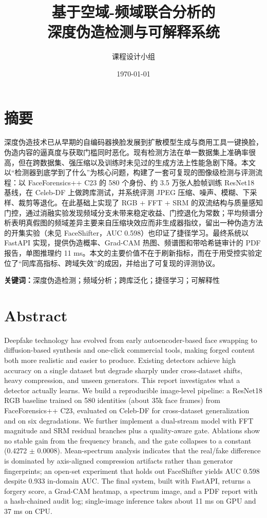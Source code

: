 \documentclass[12pt,a4paper]{article}
\title{\textbf{基于空域-频域联合分析的\\深度伪造检测与可解释系统}}
\author{课程设计小组}
\date{\today}
\begin{document}


\section*{摘要}

\noindent
深度伪造技术已从早期的自编码器换脸发展到扩散模型生成与商用工具一键换脸，伪造内容的逼真度与获取门槛同时恶化。现有检测方法在单一数据集上准确率很高，但在跨数据集、强压缩以及训练时未见过的生成方法上性能急剧下降。本文以“检测器到底学到了什么”为核心问题，构建了一套可复现的图像级检测与评测流程：以 FaceForensics++ C23 的 580 个身份、约 3.5 万张人脸帧训练 ResNet18 基线，在 Celeb-DF 上做跨库测试，并系统评测 JPEG 压缩、噪声、模糊、下采样、裁剪等退化。在此基础上实现了 RGB + FFT + SRM 的双流结构与质量感知门控，通过消融实验发现频域分支未带来稳定收益、门控退化为常数；平均频谱分析表明真假图的频域差异主要来自压缩块效应而非生成器指纹，留出一种伪造方法的开集实验（未见 FaceShifter，AUC 0.598）也印证了捷径学习。最终系统以 FastAPI 实现，提供伪造概率、Grad-CAM 热图、频谱图和带哈希链审计的 PDF 报告，单图推理约 11 ms。本文的主要价值不在于刷新指标，而在于用受控实验定位了“同库高指标、跨域失效”的成因，并给出了可复现的评测协议。

\vspace{1em}
\noindent\textbf{关键词：}深度伪造检测；频域分析；跨库泛化；捷径学习；可解释性

\newpage
\section*{Abstract}

\noindent
Deepfake technology has evolved from early autoencoder-based face swapping to diffusion-based
synthesis and one-click commercial tools, making forged content both more realistic and easier to
produce. Existing detectors achieve high accuracy on a single dataset but degrade sharply under
cross-dataset shifts, heavy compression, and unseen generators. This report investigates what a
detector actually learns. We build a reproducible image-level pipeline: a ResNet18 RGB baseline
trained on 580 identities (about 35k face frames) from FaceForensics++ C23, evaluated on Celeb-DF
for cross-dataset generalization and on six degradations. We further implement a dual-stream model
with FFT magnitude and SRM residual branches plus a quality-aware gate. Ablations show no stable
gain from the frequency branch, and the gate collapses to a constant (0.4272 $\pm$ 0.0008).
Mean-spectrum analysis indicates that the real/fake difference is dominated by axis-aligned
compression artifacts rather than generator fingerprints; an open-set experiment that holds out
FaceShifter yields AUC 0.598 despite 0.933 in-domain AUC. The final system, built with FastAPI,
returns a forgery score, a Grad-CAM heatmap, a spectrum image, and a PDF report with a
hash-chained audit log; single-image inference takes about 11 ms on GPU and 37 ms on CPU.
\end{document}
